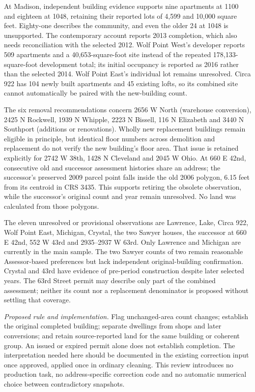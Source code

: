 At Madison, independent building evidence supports nine apartments at
1100 and eighteen at 1048, retaining their reported lots of 4,599 and
10,000 square feet. Eighty-one describes the community, and even the
older 24 at 1048 is unsupported. The contemporary account reports 2013
completion, which also needs reconciliation with the selected 2012.
Wolf Point West's developer reports 509 apartments and a 40,653-square-foot
site instead of the repeated 178,133-square-foot development total;
its initial occupancy is reported as 2016 rather than the selected
2014. Wolf Point East's individual lot remains unresolved. Circa 922
has 104 newly built apartments and 45 existing lofts, so its combined
site cannot automatically be paired with the new-building count.

The six removal recommendations concern 2656 W North (warehouse
conversion), 2425 N Rockwell, 1939 N Whipple, 2223 N Bissell, 116 N
Elizabeth and 3440 N Southport (additions or renovations). Wholly new
replacement buildings remain eligible in principle, but identical
floor numbers across demolition and replacement do not verify the
new building's floor area. That issue is retained explicitly for 2742 W
38th, 1428 N Cleveland and 2045 W Ohio. At 660 E 42nd, consecutive old
and successor assessment histories share an address; the successor's
preserved 2009 parcel point falls inside the old 2006 polygon, 6.15 feet
from its centroid in CRS 3435. This supports retiring the obsolete
observation, while the successor's original count and year remain
unresolved. No land was calculated from those polygons.

The eleven unresolved or provisional observations are Lawrence, Lake,
Circa 922, Wolf Point East, Michigan, Crystal, the two Sawyer houses,
the successor at 660 E 42nd, 552 W 43rd and 2935--2937 W 63rd. Only
Lawrence and Michigan are currently in the main sample. The two Sawyer
counts of two remain reasonable Assessor-based preferences but lack
independent original-building confirmation. Crystal and 43rd have
evidence of pre-period construction despite later selected years. The
63rd Street permit may describe only part of the combined assessment;
neither its count nor a replacement denominator is proposed without
settling that coverage.

\textit{Proposed rule and implementation.} Flag unchanged-area count
changes; establish the original completed building; separate dwellings
from shops and later conversions; and retain source-reported land for
the same building or coherent group. An issued or expired permit alone
does not establish completion. The interpretation needed here should
be documented in the existing correction input once approved, applied
once in ordinary cleaning. This review introduces no production task,
no address-specific correction code and no automatic numerical choice
between contradictory snapshots.

